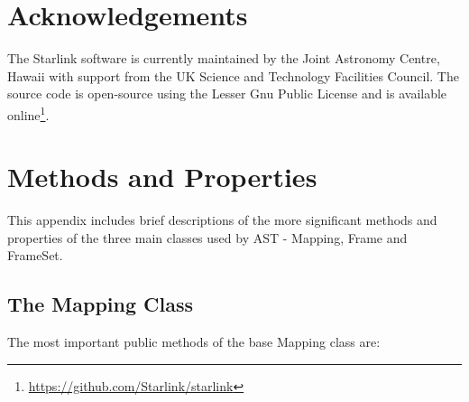 \documentclass[final,authoryear,5p,times,twocolumn]{elsarticle}
\begin{document}
\section{Acknowledgements}

The Starlink software is currently maintained by the Joint Astronomy
Centre, Hawaii with support from the UK Science and Technology
Facilities Council. The source code is open-source using the Lesser
Gnu Public License and is available
online\footnote{\url{https://github.com/Starlink/starlink}}.


\appendix

\section{Methods and Properties}
\label{app:classes}

This appendix includes brief descriptions of the more significant methods
and properties of the three main classes used by AST - Mapping, Frame and
FrameSet.

\subsection{The Mapping Class}
The most important public methods of the base Mapping class are:
\end{document}
